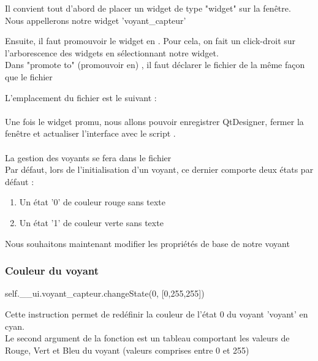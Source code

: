 \documentclass[12pt]{report}    %
\begin{document}
Il convient tout d'abord de placer un widget de type "widget" sur la fenêtre. \\
Nous appellerons notre widget 'voyant\_capteur' \\




Ensuite, il faut promouvoir le widget en .
Pour cela, on fait un click-droit sur l'arborescence des widgets en sélectionnant notre widget. \\
Dans "promote to" (promouvoir en) , il faut déclarer le fichier  de la même façon que le fichier 



L'emplacement du fichier  est le suivant : \\

 \\


Une fois le widget promu, nous allons pouvoir enregistrer QtDesigner, fermer la fenêtre et actualiser l'interface avec le script .\\ \\

La gestion des voyants se fera dans le fichier  \\


Par défaut, lors de l'initialisation d'un voyant, ce dernier comporte deux états par défaut : 


\begin{enumerate}
    \item Un état '0' de couleur rouge sans texte
    \item Un état '1' de couleur verte sans texte
\end{enumerate}

Nous souhaitons maintenant modifier les propriétés de base de notre voyant

\subsubsection{Couleur du voyant}

\begin{pyCode}
self.__ui.voyant_capteur.changeState(0, [0,255,255]) 
\end{pyCode}
Cette instruction permet de redéfinir la couleur de l'état 0 du voyant 'voyant\capteur' en cyan. \\
Le second argument de la fonction  est un tableau comportant les valeurs de Rouge, Vert et Bleu du voyant (valeurs comprises entre 0 et 255) \\
\end{document}

